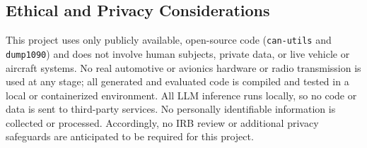 \documentclass[12pt]{article}
\begin{document}
\subsection{Ethical and Privacy Considerations}
This project uses only publicly available, open-source code (\texttt{can-utils} and \texttt{dump1090}) and does not involve human subjects, private data, or live vehicle or aircraft systems. No real automotive or avionics hardware or radio transmission is used at any stage; all generated and evaluated code is compiled and tested in a local or containerized environment. All LLM inference runs locally, so no code or data is sent to third-party services. No personally identifiable information is collected or processed. Accordingly, no IRB review or additional privacy safeguards are anticipated to be required for this project.
\end{document}
